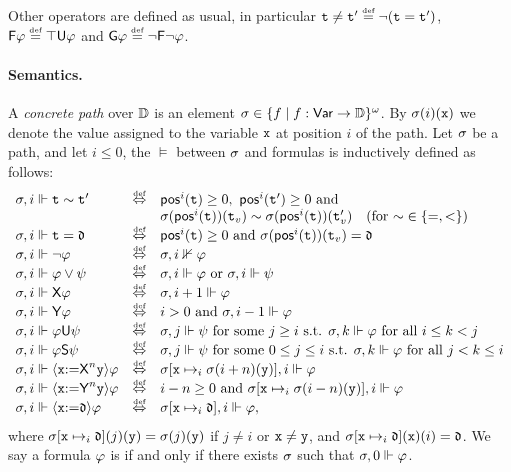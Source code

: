 Other operators are defined as usual, in particular $\aterm\neq \aterm'\egdef \neg(\aterm = \aterm')$, $\Eventually\aformula \egdef \top\Until\aformula$ and $\Always\aformula \egdef \neg\Eventually\neg\aformula$. 


\paragraph{Semantics.} A \emph{concrete path} over $\mathbb{D}$ is an element $\sigma\in\{f\mid f:{\rm \sf Var}\to\mathbb{D}\}^\omega$. By $\sigma(i)(\mathtt{x})$ we denote the value assigned to the variable $\mathtt{x}$ at position $i$ of the path.
Let $\sigma$ be a path, and let $i\leq 0$, the  $\models$ between $\sigma$ and formulas is inductively defined as follows:
\[
\begin{array}{lcl}
\apath,i \models \aterm \sim \aterm' & \iffdef & \pos^i(\aterm) \geq 0, \ \pos^i(\aterm') \geq 0 \mbox{ and } \\ & & \apath(\pos^i(\aterm))(\aterm_v) \sim \apath(\pos^i(\aterm))(\aterm'_v) \ \  \mbox{ (for ${\sim}\in\{=,<\}$) } \\
\apath,i \models \aterm = \adatum & \iffdef & \pos^i(\aterm) \geq 0 \mbox{ and } \apath(\pos^i(\aterm))(\aterm_v) = \adatum \\
\apath,i \models \neg\aformula & \iffdef & \apath,i \nVdash\aformula \\
\apath,i \models \aformula\vee\aformulabis & \iffdef & \apath,i \models \aformula \mbox{ or } \apath,i \models \aformulabis \\
\apath,i \models \Next\aformula & \iffdef & \apath,i+1 \models \aformula \\ 
\apath,i \models \Prev\aformula & \iffdef & i>0 \mbox{ and } \apath,i-1 \models \aformula \\
\apath,i \models \aformula\Until\aformulabis & \iffdef & \apath,j \models \aformulabis \mbox{ for some } j\geq i \mbox{ s.t. } \apath,k \models \aformula \mbox{ for all } i\leq k < j \\
\apath,i \models \aformula\Since\aformulabis & \iffdef & \apath,j \models \aformulabis \mbox{ for some } 0\leq j \leq i \mbox{ s.t. } \apath,k \models \aformula \mbox{ for all } j< k \leq i \\
\apath,i \models \Assign{\avar}{\Nextn\avarbis}\aformula & \iffdef & \apath[\avar\mapsto_i \apath(i+n)(\avarbis)],i \models \aformula \\ 
\apath,i \models \Assign{\avar}{\Prevn\avarbis}\aformula & \iffdef & i-n\geq 0 \mbox{ and } \apath[\avar\mapsto_i \apath(i-n)(\avarbis)],i \models \aformula \\
\apath,i \models \Assign{\avar}{\adatum}\aformula & \iffdef & \apath[\avar\mapsto_i \adatum],i \models \aformula, \\ 
\end{array}
\]
where $\sigma[\mathtt{x}\mapsto_i \mathfrak{d}](j)(\mathtt{y})=\sigma(j)(\mathtt{y})$ if $j\neq i$  or $\mathtt{x}\neq\mathtt{y}$, and $\sigma[\mathtt{x}\mapsto_i \mathfrak{d}](\mathtt{x})(i)  = \mathfrak{d}$. 
We say a formula $\varphi$ is  if and only if there exists $\sigma$ such that $\sigma,0\Vdash\varphi$.




